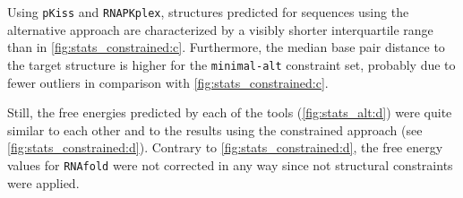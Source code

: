 \documentclass[../../master.tex]{subfiles}
\begin{document}
Using \texttt{pKiss} and \texttt{RNAPKplex}, structures predicted for sequences using the alternative approach are characterized by a visibly shorter interquartile range than in \autoref{fig:stats_constrained:c}.
Furthermore, the median base pair distance to the target structure is higher for the \texttt{minimal-alt} constraint set, probably due to fewer outliers in comparison with \autoref{fig:stats_constrained:c}.

Still, the free energies predicted by each of the tools (\autoref{fig:stats_alt:d}) were quite similar to each other and to the results using the constrained approach (see \autoref{fig:stats_constrained:d}).
Contrary to \autoref{fig:stats_constrained:d}, the free energy values for \texttt{RNAfold} were not corrected in any way since not structural constraints were applied.
\end{document}
